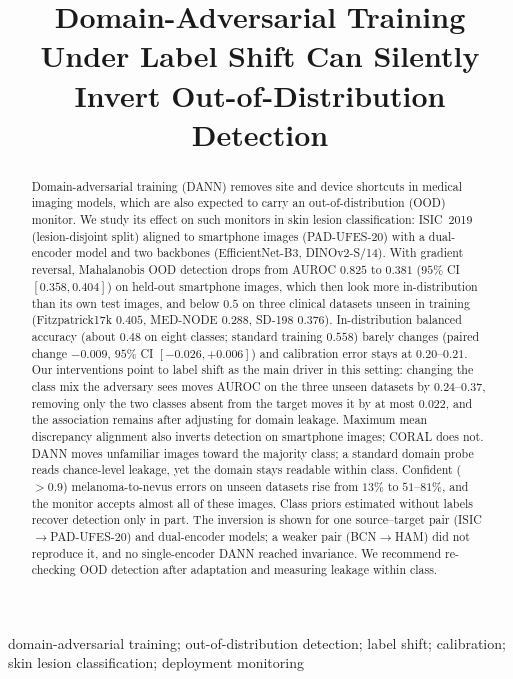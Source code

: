 \documentclass{midl}
\title[DANN Can Silently Invert OOD Detection]{Domain-Adversarial Training Under Label
Shift Can Silently Invert Out-of-Distribution Detection}
\begin{document}
\maketitle

\begin{abstract}
Domain-adversarial training (DANN) removes site and device shortcuts in medical imaging
models, which are also expected to carry an out-of-distribution (OOD) monitor. We study its
effect on such monitors in skin lesion classification: ISIC~2019 (lesion-disjoint split)
aligned to smartphone images (PAD-UFES-20) with a dual-encoder model and two backbones
(EfficientNet-B3, DINOv2-S/14). With gradient reversal, Mahalanobis OOD detection drops from
AUROC $0.825$ to $0.381$ ($95\%$ CI $[0.358, 0.404]$) on held-out smartphone images, which
then look more in-distribution than its own test images, and below $0.5$ on three
clinical datasets unseen in training (Fitzpatrick17k $0.405$, MED-NODE $0.288$, SD-198
$0.376$). In-distribution balanced accuracy (about $0.48$ on eight classes; standard training
$0.558$) barely changes (paired change $-0.009$, $95\%$ CI $[-0.026, +0.006]$) and calibration
error stays at $0.20$--$0.21$. Our interventions point to label shift as the main driver in
this setting: changing the class mix the adversary sees moves AUROC on the three unseen
datasets by $0.24$--$0.37$, removing only the two classes absent from the target moves it by
at most $0.022$, and the association remains after adjusting for domain leakage. Maximum mean
discrepancy alignment also inverts detection on smartphone images; CORAL does not. DANN
moves unfamiliar images toward the majority class; a standard domain probe reads
chance-level leakage, yet the domain stays readable within class. Confident ($>0.9$)
melanoma-to-nevus errors on unseen datasets rise from $13\%$ to $51$--$81\%$, and the monitor
accepts almost all of these images. Class priors estimated without labels recover detection
only in part. The inversion is shown for one source--target pair (ISIC$\to$PAD-UFES-20) and
dual-encoder models; a weaker pair (BCN$\to$HAM) did not reproduce it, and no single-encoder
DANN reached invariance. We recommend re-checking OOD detection after adaptation and
measuring leakage within class.
\end{abstract}

\begin{keywords}
domain-adversarial training; out-of-distribution detection; label shift; calibration;
skin lesion classification; deployment monitoring
\end{keywords}
\end{document}
